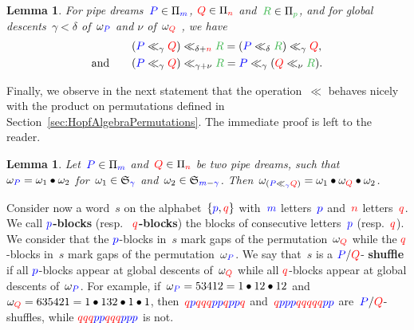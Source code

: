 \documentclass{amsart}
\newtheorem{lemma}[theorem]{Lemma}
\theoremstyle{definition}
\renewcommand{\b}[1]{{\color{blue} #1}} %
\renewcommand{\r}[1]{{\color{red} #1}} %
\newcommand{\g}[1]{{\color{DarkGreen} #1}} %
\newcommand{\defn}[1]{\textbf{\textsf{\color{PineGreen} #1}}} %
\newcommand{\fS}{\mathfrak{S}} %
\newcommand{\gdproduct}{\bullet} %
\newcommand{\pipeDreams}{\Pi} %
\newcommand{\gammainsertion}{\ll}  %
\begin{document}
\begin{lemma}
\label{lem:rulesInsertion}
For pipe dreams~$\b{P} \in \pipeDreams_\b{m}$, $\r{Q} \in \pipeDreams_\r{n}$ and~$\g{R} \in \pipeDreams_\g{p}$, and for global descents~$\gamma < \delta$ of~$\omega_\b{P}$ and $\nu$ of~$\omega_\r{Q}$ , we have
\begin{align}
\label{eq:ruleInsertionA}
& (\b{P} \gammainsertion_\gamma \r{Q}) \gammainsertion_{\delta + \r{n}} \g{R} = (\b{P} \gammainsertion_\delta \g{R}) \gammainsertion_\gamma \r{Q}, \\
\label{eq:ruleInsertionB}
\text{and}\qquad
& (\b{P} \gammainsertion_\gamma \r{Q}) \gammainsertion_{\gamma + \nu} \g{R} = \b{P} \gammainsertion_\gamma (\r{Q} \gammainsertion_\nu \g{R}).
\end{align}
\end{lemma}

Finally, we observe in the next statement that the operation~$\gammainsertion$ behaves nicely with the product on permutations defined in Section~\ref{sec:HopfAlgebraPermutations}. The immediate proof is left to the reader.

\begin{lemma}
\label{lem:gbinsertion}
Let~$\b{P} \in \pipeDreams_\b{m}$ and~$\r{Q} \in \pipeDreams_\r{n}$ be two pipe dreams, such that~$\omega_{\b{P}} = \omega_1 \gdproduct \omega_2$ for~$\omega_1 \in \fS_{\b{\gamma}}$ and~$\omega_2 \in \fS_{\b{m}-\b{\gamma}}$. Then~$\omega_{(\b{P} \gammainsertion_\b{\gamma} \r{Q})} = \omega_1 \gdproduct \omega_{\r{Q}} \gdproduct \omega_2$.
\end{lemma}

Consider now a word~$s$ on the alphabet~$\{\b{p}, \r{q}\}$ with~$\b{m}$ letters~$\b{p}$ and~$\r{n}$ letters~$\r{q}$. We call \defn{$\b{p}$-blocks} (resp.~\defn{$\r{q}$-blocks}) the blocks of consecutive letters~$\b{p}$ (resp.~$\r{q}$). We consider that the $\b{p}$-blocks in~$s$ mark gaps of the permutation~$\omega_{\r{Q}}$ while the $\r{q}$-blocks in~$s$ mark gaps of the permutation~$\omega_{\b{P}}$. We say that~$s$ is a $\b{P}/\r{Q}$-\defn{shuffle} if all $\b{p}$-blocks appear at global descents of~$\omega_\r{Q}$ while all $\r{q}$-blocks appear at global descents of~$\omega_\b{P}$. For example, if~$\omega_\b{P} = 53412= 1 \gdproduct 12 \gdproduct 12$ and~$\omega_\r{Q} = 635421 = 1 \gdproduct 132 \gdproduct 1 \gdproduct 1$, then~$\r{q}\b{p}\r{qqq}\b{pp}\r{q}\b{pp}\r{q}$ and~$\r{q}\b{ppp}\r{qqqqq}\b{pp}$ are~$\b{P}/\r{Q}$-shuffles, while $\r{qqq}\b{pp}\r{qqq}\b{ppp}$ is not.
\end{document}
